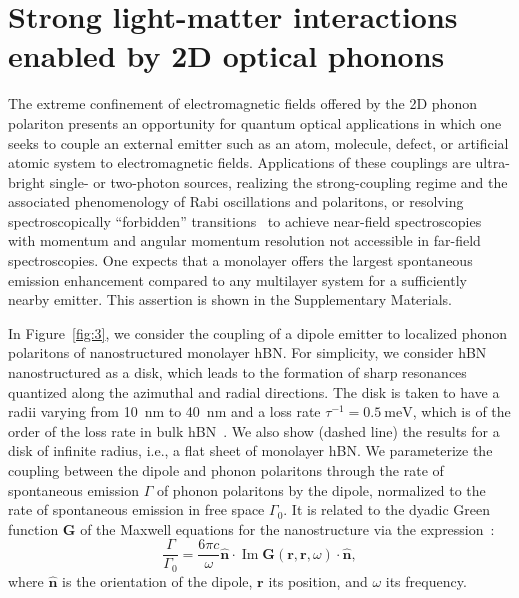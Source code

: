 \documentclass[aps,prb,twocolumn,
	           groupedaddress,superscriptaddress,
               amsfonts,amssymb,amsmath,floatfix,
	           citeautoscript]{revtex4-1}
\renewcommand{\Im}{\operatorname{Im}}
\begin{document}
\section{Strong light-matter interactions enabled by 2D optical phonons}

The extreme confinement of electromagnetic fields offered by the 2D phonon polariton presents an opportunity for quantum optical applications in which one seeks to couple an external emitter such as an atom, molecule, defect, or artificial atomic system to electromagnetic fields. Applications of these couplings are ultra-bright single- or two-photon sources, realizing the strong-coupling regime and the associated phenomenology of Rabi oscillations and polaritons, or resolving spectroscopically ``forbidden'' transitions~\cite{koppens2011graphene,autore2018boron,rivera2016shrinking,rivera2017making,kurman2018control} to achieve near-field spectroscopies with momentum and angular momentum resolution not accessible in far-field spectroscopies. One expects that a monolayer offers the largest spontaneous emission enhancement compared to any multilayer system for a sufficiently nearby emitter. This assertion is shown in the Supplementary Materials.


In Figure~\ref{fig:3}, we consider the coupling of a dipole emitter to localized phonon polaritons of nanostructured monolayer hBN. For simplicity, we consider hBN nanostructured as a disk, which leads to the formation of sharp resonances quantized along the azimuthal and radial directions. The disk is taken to have a radii varying from \SI{10}{\nm} to \SI{40}{nm}
and a loss rate $\tau^{-1} = \SI{0.5}{\meV}$, which is of the order of the loss rate in bulk hBN~\cite{caldwell2014sub, dai2014tunable}. We also show (dashed line) the results for a disk of infinite radius, i.e., a flat sheet of monolayer hBN. We parameterize the coupling between the dipole and phonon polaritons through the rate of spontaneous emission $\Gamma$ of phonon polaritons by the dipole, normalized to the rate of spontaneous emission in free space $\Gamma_0$. It is related to the dyadic Green function $\mathbf{G}$ of the Maxwell equations for the nanostructure via the expression~\cite{novotny2012principles}:
\begin{equation}
	\frac{\Gamma}{\Gamma_0} 
	=  \frac{6\pi c}{\omega}\hat{\mathbf{n}}\cdot\Im\mathbf{G}(\mathbf{r},\mathbf{r},\omega)\cdot\hat{\mathbf{n}},
\end{equation}
where $\hat{\mathbf{n}}$ is the orientation of the dipole, $\mathbf{r}$ its position, and $\omega$ its frequency.
\end{document}
